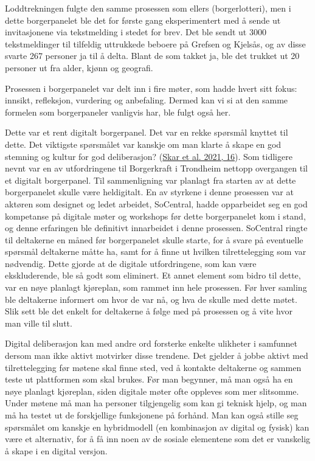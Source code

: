\documentclass[
  12pt,
  a4paper, 12pt]{article}
\begin{document}
Loddtrekningen fulgte den samme prosessen som ellers (borgerlotteri), men i dette borgerpanelet ble det for første gang eksperimentert med å sende ut invitasjonene via tekstmelding i stedet for brev. Det ble sendt ut 3000 tekstmeldinger til tilfeldig uttrukkede beboere på Grefsen og Kjelsås, og av disse svarte 267 personer ja til å delta. Blant de som takket ja, ble det trukket ut 20 personer ut fra alder, kjønn og geografi.

Prosessen i borgerpanelet var delt inn i fire møter, som hadde hvert sitt fokus: innsikt, refleksjon, vurdering og anbefaling. Dermed kan vi si at den samme formelen som borgerpaneler vanligvis har, ble fulgt også her.

Dette var et rent digitalt borgerpanel. Det var en rekke spørsmål knyttet til dette. Det viktigste spørsmålet var kanskje om man klarte å skape en god stemning og kultur for god deliberasjon? (\protect\hyperlink{ref-skar_borgerpanel_2021}{Skar et al. 2021, 16}). Som tidligere nevnt var en av utfordringene til Borgerkraft i Trondheim nettopp overgangen til et digitalt borgerpanel. Til sammenligning var planlagt fra starten av at dette borgerpanelet skulle være heldigitalt. En av styrkene i denne prosessen var at aktøren som designet og ledet arbeidet, SoCentral, hadde opparbeidet seg en god kompetanse på digitale møter og workshops før dette borgerpanelet kom i stand, og denne erfaringen ble definitivt innarbeidet i denne prosessen. SoCentral ringte til deltakerne en måned før borgerpanelet skulle starte, for å svare på eventuelle spørsmål deltakerne måtte ha, samt for å finne ut hvilken tilrettelegging som var nødvendig. Dette gjorde at de digitale utfordringene, som kan være ekskluderende, ble så godt som eliminert. Et annet element som bidro til dette, var en nøye planlagt kjøreplan, som rammet inn hele prosessen. Før hver samling ble deltakerne informert om hvor de var nå, og hva de skulle med dette møtet. Slik sett ble det enkelt for deltakerne å følge med på prosessen og å vite hvor man ville til slutt.

Digital deliberasjon kan med andre ord forsterke enkelte ulikheter i samfunnet dersom man ikke aktivt motvirker disse trendene. Det gjelder å jobbe aktivt med tilrettelegging før møtene skal finne sted, ved å kontakte deltakerne og sammen teste ut plattformen som skal brukes. Før man begynner, må man også ha en nøye planlagt kjøreplan, siden digitale møter ofte oppleves som mer slitsomme. Under møtene må man ha personer tilgjengelig som kan gi teknisk hjelp, og man må ha testet ut de forskjellige funksjonene på forhånd. Man kan også stille seg spørsmålet om kanskje en hybridmodell (en kombinasjon av digital og fysisk) kan være et alternativ, for å få inn noen av de sosiale elementene som det er vanskelig å skape i en digital versjon.
\end{document}

